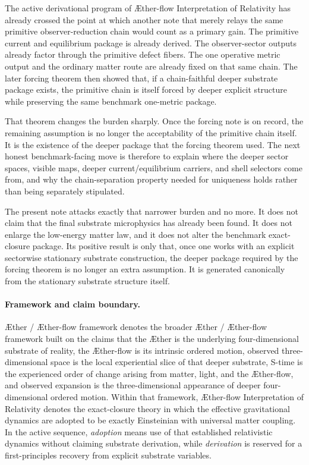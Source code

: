 \documentclass[11pt]{article}
\newcommand{\Aether}{\AE{}ther}
\newcommand{\Aflow}{\AE{}ther-flow}
\newcommand{\TheoryName}{\Aflow{} Interpretation of Relativity}
\newcommand{\TheoryProgram}{\Aether{} / \Aflow{} framework}
\begin{document}
The active derivational program of \TheoryName{} has already crossed the point at which another note that merely relays the same primitive observer-reduction chain would count as a primary gain. The primitive current and equilibrium package is already derived. The observer-sector outputs already factor through the primitive defect fibers. The one operative metric output and the ordinary matter route are already fixed on that same chain. The later forcing theorem then showed that, if a chain-faithful deeper substrate package exists, the primitive chain is itself forced by deeper explicit structure while preserving the same benchmark one-metric package.

That theorem changes the burden sharply. Once the forcing note is on record, the remaining assumption is no longer the acceptability of the primitive chain itself. It is the existence of the deeper package that the forcing theorem used. The next honest benchmark-facing move is therefore to explain where the deeper sector spaces, visible maps, deeper current/equilibrium carriers, and shell selectors come from, and why the chain-separation property needed for uniqueness holds rather than being separately stipulated.

The present note attacks exactly that narrower burden and no more. It does not claim that the final substrate microphysics has already been found. It does not enlarge the low-energy matter law, and it does not alter the benchmark exact-closure package. Its positive result is only that, once one works with an explicit sectorwise stationary substrate construction, the deeper package required by the forcing theorem is no longer an extra assumption. It is generated canonically from the stationary substrate structure itself.

\paragraph{Framework and claim boundary.}
\TheoryProgram{} denotes the broader \Aether{} / \Aflow{} framework built on the claims that the \Aether{} is the underlying four-dimensional substrate of reality, the \Aflow{} is its intrinsic ordered motion, observed three-dimensional space is the local experiential slice of that deeper substrate, S-time is the experienced order of change arising from matter, light, and the \Aflow{}, and observed expansion is the three-dimensional appearance of deeper four-dimensional ordered motion. Within that framework, \TheoryName{} denotes the exact-closure theory in which the effective gravitational dynamics are adopted to be exactly Einsteinian with universal matter coupling. In the active sequence, \emph{adoption} means use of that established relativistic dynamics without claiming substrate derivation, while \emph{derivation} is reserved for a first-principles recovery from explicit substrate variables.
\end{document}
